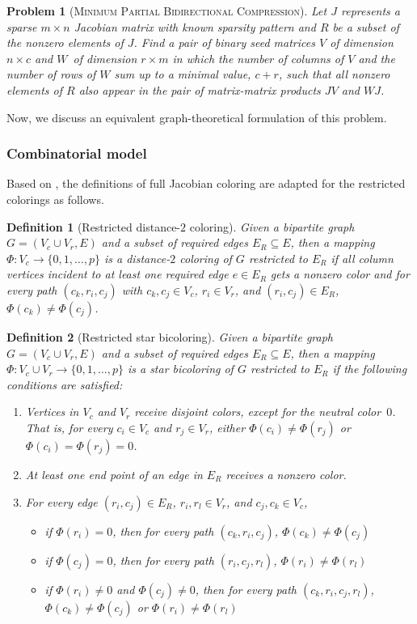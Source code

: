 \documentclass[12pt, twoside,a4paper,toc=bibliography]{scrbook}
\newtheorem{problem}{Problem}
\newtheorem{definition}{Definition}
\newcommand{\col}{\ensuremath{c}}
\newcommand{\row}{\ensuremath{r}}
\newcommand{\MinRBidCom}{\textsc{Minimum Partial Bidirectional Compression}}
\begin{document}
\begin{problem}[\MinRBidCom]
\label{p.seed.rbid} Let $J$ represents a sparse ${m\times n}$ Jacobian matrix with known sparsity
pattern and $R$ be a subset of the nonzero elements of $J$.
Find a pair of binary seed matrices $V$ of dimension $n\times \col$ and $W$~of
dimension $\row \times m$ in which the number of columns of $V$ and the number of rows of $W$ sum up
to a minimal value, $\col + \row$, such that all nonzero elements of $R$ also appear in
the pair of matrix-matrix products $JV$ and $WJ$.
\end{problem}

Now, we discuss an equivalent graph-theoretical formulation of this problem.

\subsubsection{Combinatorial model}
Based on \cite{Gebremedhin05whatcolor,Lulfesmann2012Fap}, the definitions
of full Jacobian coloring are adapted for the restricted colorings as follows.
\begin{definition}[Restricted distance-$2$ coloring]\label{d.coloring.d2}
Given a bipartite graph $G=(V_c\cup V_r, E)$ and a subset of required edges
$E_R\subseteq E$, then a mapping $\Phi:V_c \to
\{0,1,\dots ,p\}$ is a distance-$2$ coloring
of $G$ restricted to $E_R$
if all column vertices incident to at least one required edge $e\in E_R$
gets a nonzero color and
for every path $(c_k,r_i,c_j)$ with $c_k, c_j\in V_c$, $r_i\in V_r$, and $(r_i,c_j)\in E_R$,
$\Phi(c_k) \neq \Phi(c_j)$.
\end{definition}
\begin{definition}[Restricted star bicoloring]\label{d.coloring.bicol}
Given a bipartite graph $G=(V_c\cup V_r, E)$ and a subset of required edges
$E_R\subseteq E$, then a mapping $\Phi:V_c \cup V_r \to
\{0,1,\dots ,p\}$ is a star bicoloring of $G$ restricted to $E_R$
if the following conditions are satisfied:
\begin{enumerate}
\item Vertices in $V_c$ and $V_r$ receive disjoint colors, except for the neutral color~$0$. That
is, for every $c_i \in V_c$ and $r_j \in V_r$, either $\Phi(c_i) \neq \Phi(r_j)$ or
$\Phi(c_i)=\Phi(r_j)=0$.

\item At least one end point of an edge in $E_R$ receives a nonzero color.
\item For every edge $(r_i,c_j)\in E_R$, $r_i, r_l\in V_r$, and
$c_j, c_k\in V_c$,
\begin{itemize}
\item if $\Phi (r_i) = 0$, then for every path $(c_k,r_i,c_j)$, $\Phi (c_k)\neq \Phi (c_j)$
\item if $\Phi (c_j) = 0$, then for every path $(r_i,c_j,r_l)$, $\Phi (r_i)\neq \Phi (r_l)$
\item if $\Phi (r_i) \neq 0$ and $\Phi (c_j) \neq 0$, then for every path $(c_k,r_i,c_j,r_l)$,
$\Phi (c_k)\neq \Phi (c_j)$ or $\Phi (r_i)\neq \Phi (r_l)$
\end{itemize}
\end{enumerate}
\end{definition}
\end{document}
